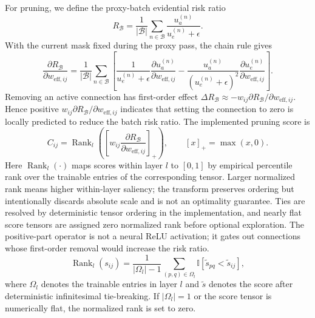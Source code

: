 \documentclass[letterpaper]{article} %
\newcommand{\pospart}[1]{\left[#1\right]_+}
\begin{document}
For pruning, we define the proxy-batch evidential risk ratio
\begin{equation}\label{eq:batch_risk}
    R_{\mathcal{B}}
    =
    \frac{1}{|\mathcal{B}|}
    \sum_{n\in\mathcal{B}}
    \frac{u_a^{(n)}}{u_e^{(n)}+\epsilon}.
\end{equation}
With the current mask fixed during the proxy pass, the chain rule gives
\begin{equation}\label{eq:r_chain_main}
    \frac{\partial R_{\mathcal{B}}}{\partial w_{\text{eff},ij}}
    =
    \frac{1}{|\mathcal{B}|}\sum_{n\in\mathcal{B}}
    \left[
    \frac{1}{u_e^{(n)}+\epsilon}\frac{\partial u_a^{(n)}}{\partial w_{\text{eff},ij}}
    -\frac{u_a^{(n)}}{(u_e^{(n)}+\epsilon)^2}
    \frac{\partial u_e^{(n)}}{\partial w_{\text{eff},ij}}
    \right].
\end{equation}
Removing an active connection has first-order effect $\Delta R_{\mathcal B}\approx -w_{ij}\partial R_{\mathcal B}/\partial w_{\text{eff},ij}$. Hence positive $w_{ij}\partial R_{\mathcal B}/\partial w_{\text{eff},ij}$ indicates that setting the connection to zero is locally predicted to reduce the batch risk ratio. The implemented pruning score is
\begin{equation}\label{eq:C_ij}
    C_{ij}
    =
    \operatorname{Rank}_{l}\!\left(
    \pospart{w_{ij}
    \frac{\partial R_{\mathcal B}}{\partial w_{\text{eff},ij}}}
    \right),
    \qquad
    \pospart{x}=\max(x,0).
\end{equation}
Here $\operatorname{Rank}_{l}(\cdot)$ maps scores within layer $l$ to $[0,1]$ by empirical percentile rank over the trainable entries of the corresponding tensor. Larger normalized rank means higher within-layer saliency; the transform preserves ordering but intentionally discards absolute scale and is not an optimality guarantee. Ties are resolved by deterministic tensor ordering in the implementation, and nearly flat score tensors are assigned zero normalized rank before optional exploration. The positive-part operator is not a neural ReLU activation; it gates out connections whose first-order removal would increase the risk ratio.
\begin{equation}\label{eq:rank_def}
    \operatorname{Rank}_{l}(s_{ij})
    =
    \frac{1}{|\Omega_l|-1}
    \sum_{(p,q)\in\Omega_l}
    \mathbb{I}\!\left[\tilde{s}_{pq}<\tilde{s}_{ij}\right],
\end{equation}
where $\Omega_l$ denotes the trainable entries in layer $l$ and $\tilde{s}$ denotes the score after deterministic infinitesimal tie-breaking. If $|\Omega_l|=1$ or the score tensor is numerically flat, the normalized rank is set to zero.
\end{document}
